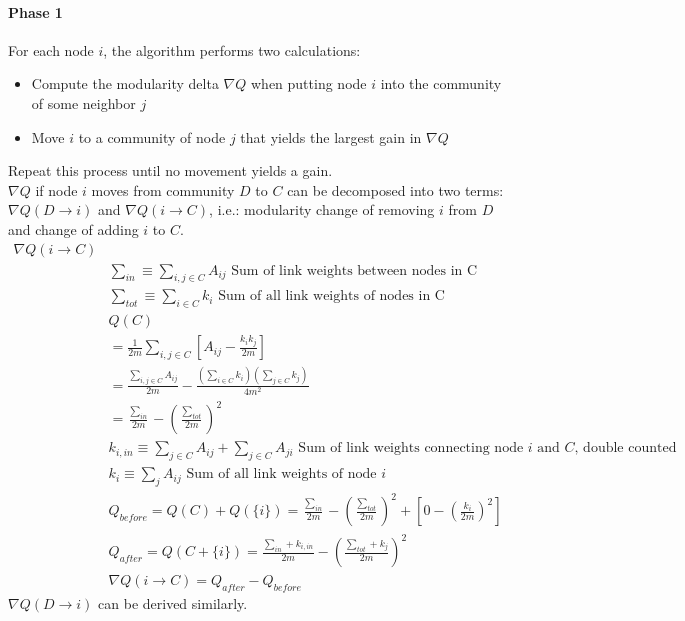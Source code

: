 \paragraph{Phase 1} 
For each node $i$, the algorithm performs two calculations: 
    \begin{itemize}
        \item Compute the modularity delta $\nabla Q$ when putting node $i$ into the community of some neighbor $j$
        \item Move $i$ to a community of node $j$ that yields the largest gain in $\nabla Q$
    \end{itemize}
Repeat this process until no movement yields a gain. \\
$\nabla Q$ if node $i$ moves from community $D$ to $C$ can be decomposed into two terms: $\nabla Q(D \to i)$ and $\nabla Q(i \to C)$, i.e.: modularity change of removing $i$ from $D$ and change of adding $i$ to $C$. 
    \begin{align*}
        \nabla Q(i\to C) & \\ 
        & \sum_{in} \equiv \sum_{i,j \in C} A_{ij} \textrm{ Sum of link weights between nodes in C} \\
        & \sum_{tot} \equiv \sum_{i\in C} k_i \textrm{ Sum of all link weights of nodes in C} \\
        & Q(C) \\
        & = \frac{1}{2m}\sum_{i,j \in C}[A_{ij} - \frac{k_i k_j}{2m}] \\
        & = \frac{\sum_{i,j \in C} A_{ij}}{2m} - \frac{(\sum_{i\in C}k_i)(\sum_{j\in C} k_j)}{4m^2}\\
        & = \frac{\sum_{in}}{2m} - (\frac{\sum_{tot}}{2m})^2\\
        & k_{i, in} \equiv \sum_{j\in C} A_{ij} + \sum_{j\in C} A_{ji} \textrm{ Sum of link weights connecting node $i$ and $C$, double counted}\\
        & k_i \equiv \sum_{j} A_{ij} \textrm{ Sum of all link weights of node $i$}\\
        & Q_{before} = Q(C) + Q(\{ i \}) = \frac{\sum_{in}}{2m} - (\frac{\sum_{tot}}{2m})^2 + [0 - (\frac{k_i}{2m})^2]\\
        & Q_{after} = Q(C + \{ i \}) = \frac{\sum_{in} + k_{i, in}}{2m} - \left(\frac{\sum_{tot} + k_j}{2m} \right)^2\\
        & \nabla Q(i \to C) = Q_{after} - Q_{before}
    \end{align*}
$\nabla Q(D\to i)$ can be derived similarly. 


